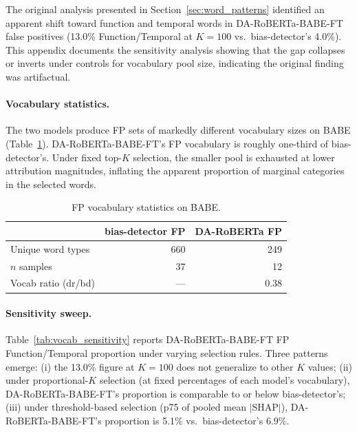 \documentclass[11pt]{article}
\begin{document}
The original analysis presented in Section~\ref{sec:word_patterns} 
identified an apparent shift toward function and temporal words in 
DA-RoBERTa-BABE-FT false positives (13.0\% Function/Temporal at 
$K{=}100$ vs.\ bias-detector's 4.0\%). This appendix documents the 
sensitivity analysis showing that the gap collapses or inverts under 
controls for vocabulary pool size, indicating the original finding was 
artifactual.

\paragraph{Vocabulary statistics.} The two models produce FP sets of 
markedly different vocabulary sizes on BABE 
(Table~\ref{tab:vocab_stats}). DA-RoBERTa-BABE-FT's FP vocabulary is 
roughly one-third of bias-detector's. Under fixed top-$K$ selection, 
the smaller pool is exhausted at lower attribution magnitudes, 
inflating the apparent proportion of marginal categories in the 
selected words.

\begin{table}[h]
\centering
\small
\begin{tabular}{lrr}
\toprule
 & bias-detector FP & DA-RoBERTa FP \\
\midrule
Unique word types & 660 & 249 \\
$n$ samples       & 37  & 12  \\
Vocab ratio (dr/bd) & --- & 0.38 \\
\bottomrule
\end{tabular}
\caption{FP vocabulary statistics on BABE.}
\label{tab:vocab_stats}
\end{table}

\paragraph{Sensitivity sweep.} Table~\ref{tab:vocab_sensitivity} reports 
DA-RoBERTa-BABE-FT FP Function/Temporal proportion under varying 
selection rules. Three patterns emerge: (i) the 13.0\% figure at 
$K{=}100$ does not generalize to other $K$ values; (ii) under 
proportional-$K$ selection (at fixed percentages of each model's 
vocabulary), DA-RoBERTa-BABE-FT's proportion is comparable to or below 
bias-detector's; (iii) under threshold-based selection (p75 of pooled 
mean $|$SHAP$|$), DA-RoBERTa-BABE-FT's proportion is 5.1\% vs.\ 
bias-detector's 6.9\%.
\end{document}
